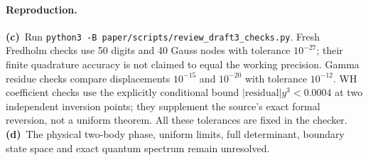 \documentclass[11pt,a4paper]{article}
\newcommand{\C}{\textbf{(c)}\ }
\newcommand{\D}{\textbf{(d)}\ }
\newcommand{\file}[1]{\nolinkurl{#1}}
\begin{document}
\paragraph{Reproduction.}
\C Run \file{python3 -B paper/scripts/review_draft3_checks.py}.
Fresh Fredholm checks use 50 digits and 40 Gauss nodes with tolerance
$10^{-27}$; their finite quadrature accuracy is not claimed to equal the
working precision. Gamma residue checks compare displacements
$10^{-15}$ and $10^{-20}$ with tolerance $10^{-12}$.
WH coefficient checks use the explicitly conditional bound
$|\mathrm{residual}|y^3<0.0004$ at two independent inversion points;
they supplement the source's exact formal reversion, not a uniform theorem.
All these tolerances are fixed in the checker.
\D The physical two-body phase, uniform limits, full determinant,
boundary state space and exact quantum spectrum remain unresolved.
\end{document}
